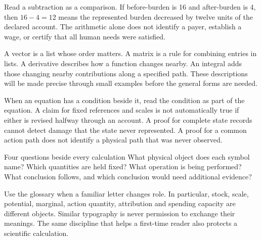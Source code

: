 Read a subtraction as a comparison. If before-burden is 16 and after-burden is 4, then $16-4=12$ means the represented burden decreased by twelve units of the declared account. The arithmetic alone does not identify a payer, establish a wage, or certify that all human needs were satisfied.

A vector is a list whose order matters. A matrix is a rule for combining entries in lists. A derivative describes how a function changes nearby. An integral adds those changing nearby contributions along a specified path. These descriptions will be made precise through small examples before the general forms are needed.

When an equation has a condition beside it, read the condition as part of the equation. A claim for fixed references and scales is not automatically true if either is revised halfway through an account. A proof for complete state records cannot detect damage that the state never represented. A proof for a common action path does not identify a physical path that was never observed.

\begin{intuitionbox}{Four questions beside every calculation}
What physical object does each symbol name? Which quantities are held fixed? What operation is being performed? What conclusion follows, and which conclusion would need additional evidence?
\end{intuitionbox}

Use the glossary when a familiar letter changes role. In particular, stock, scale, potential, marginal, action quantity, attribution and spending capacity are different objects. Similar typography is never permission to exchange their meanings. The same discipline that helps a first-time reader also protects a scientific calculation.

